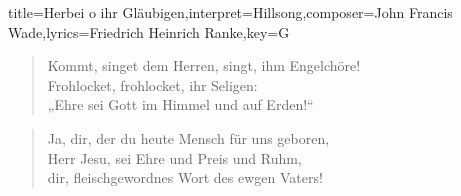 \documentclass[]{leadsheet}
\begin{document}
\begin{song}{title={Herbei o ihr Gläubigen},interpret={Hillsong},composer={John Francis Wade},lyrics={Friedrich Heinrich Ranke},key={G}}
\begin{verse}
Kommt, singet dem Herren, singt, ihm Engelchöre! \\
Frohlocket, frohlocket, ihr Seligen: \\
„Ehre sei Gott im Himmel und auf Erden!“ \\
\end{verse}

\begin{verse}
Ja, dir, der du heute Mensch für uns geboren, \\
Herr Jesu, sei Ehre und Preis und Ruhm, \\
dir, fleischgewordnes Wort des ewgen Vaters! 
\end{verse}

\end{song}
\end{document}
